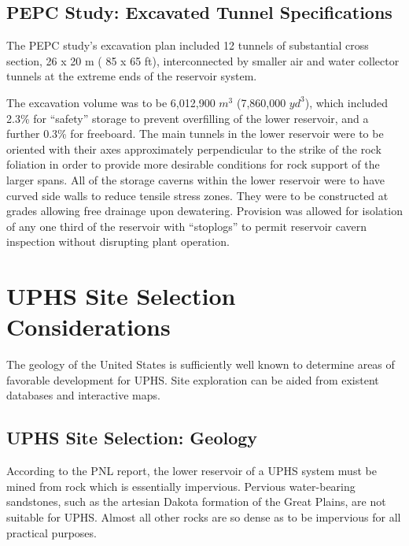 \documentclass[hidelinks,12pt,a4paper]{article}
\begin{document}
\subsection{PEPC Study: Excavated Tunnel Specifications}
The PEPC study's excavation plan included 12 tunnels of substantial cross section, 26 x 20 m ( 85 x 65 ft), interconnected by smaller air and water collector tunnels at the extreme ends of the reservoir system.

The excavation volume was to be 6,012,900 $m^3$ (7,860,000 $yd^3$), which included 2.3\% for “safety” storage to prevent overfilling of the lower reservoir, and a further 0.3\% for freeboard. The main tunnels in the lower reservoir were to be oriented with their axes approximately perpendicular to the strike of the rock foliation in order to provide more desirable conditions for rock support of the larger spans. All of the storage caverns within the lower reservoir were to have curved side walls to reduce tensile stress zones. They were to be constructed at grades allowing free drainage upon dewatering. Provision was allowed for isolation of any one third of the reservoir with “stoplogs” to permit reservoir cavern inspection without disrupting plant operation.

\pagebreak[1]
\section{UPHS Site Selection Considerations}
The geology of the United States is sufficiently well known to determine areas of favorable development for UPHS. Site exploration can be aided from existent databases and interactive maps.

\subsection{UPHS Site Selection: Geology}
According to the PNL report, the lower reservoir of a UPHS system must be mined from rock which is essentially impervious. Pervious water-bearing sandstones, such as the artesian Dakota formation of the Great Plains, are not suitable for UPHS. Almost all other rocks are so dense as to be impervious for all practical purposes. \cite{UndergroundPumpedHydroelectricStorage}
\end{document}

